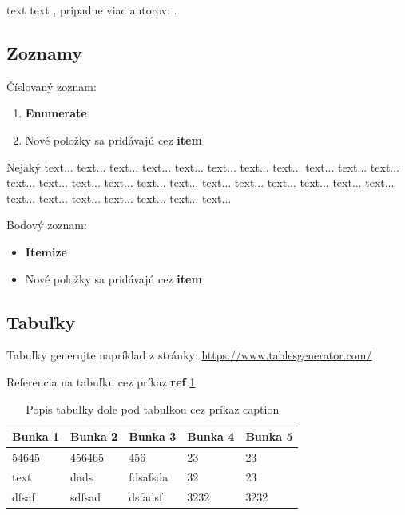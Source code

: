 text text \cite{Li2006}, pripadne viac autorov: \cite{latexcompanion,Chen2012a,Zheng2006}.

\subsection{Zoznamy}

Číslovaný zoznam:
\begin{enumerate}
	\item \textbf{Enumerate}
	\item Nové položky sa pridávajú cez \textbf{item}
\end{enumerate}

Nejaký text...  text...  text...  text...  text...  text...  text...  text...  text...  text...  text...  text...  text...  text...  text...  text...  text...  text...  text...  text...  text...  text...  text...  text...  text...  text...  text...  text...  text...  text...

Bodový zoznam:
\begin{itemize}
	\item \textbf{Itemize}
	\item Nové položky sa pridávajú cez \textbf{item}
\end{itemize}


\subsection{Tabuľky}

Tabuľky generujte napríklad z stránky: \url{https://www.tablesgenerator.com/}


Referencia na tabuľku cez príkaz \textbf{ref} \ref{table1}

\begin{table}[h!]
\centering
\begin{tabular}{|l|l|l|l|l|}
\hline
\textbf{Bunka 1} & \textbf{Bunka 2} & \textbf{Bunka 3} & \textbf{Bunka 4} & \textbf{Bunka 5} \\ \hline
54645            & 456465           & 456              & 23               & 23               \\ \hline
text             & dads             & fdsafsda         & 32               & 23               \\ \hline
dfsaf            & sdfsad           & dsfadsf          & 3232             & 3232             \\ \hline
\end{tabular}
\caption{Popis tabuľky dole pod tabuľkou cez príkaz caption}
\label{table1}
\end{table}





